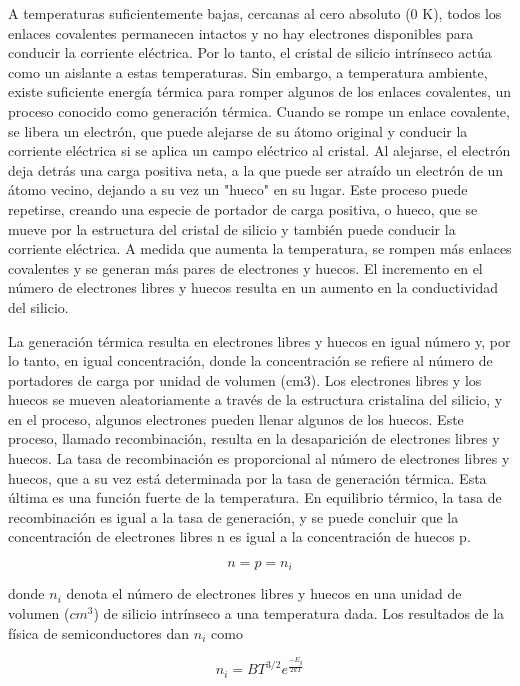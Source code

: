 A temperaturas suficientemente bajas, cercanas al cero absoluto (0 K), todos los enlaces covalentes permanecen intactos y no hay electrones disponibles para conducir la corriente eléctrica. Por lo tanto, el cristal de silicio intrínseco actúa como un aislante a estas temperaturas.
Sin embargo, a temperatura ambiente, existe suficiente energía térmica para romper algunos de los enlaces covalentes, un proceso conocido como generación térmica. Cuando se rompe un enlace covalente, se libera un electrón, que puede alejarse de su átomo original y conducir la corriente eléctrica si se aplica un campo eléctrico al cristal.
Al alejarse, el electrón deja detrás una carga positiva neta, a la que puede ser atraído un electrón de un átomo vecino, dejando a su vez un "hueco" en su lugar. Este proceso puede repetirse, creando una especie de portador de carga positiva, o hueco, que se mueve por la estructura del cristal de silicio y también puede conducir la corriente eléctrica.
A medida que aumenta la temperatura, se rompen más enlaces covalentes y se generan más pares de electrones y huecos. El incremento en el número de electrones libres y huecos resulta en un aumento en la conductividad del silicio.

La generación térmica resulta en electrones libres y huecos en igual número y, por lo tanto, en igual concentración, donde la concentración se refiere al número de portadores de carga por unidad de volumen (cm3). Los electrones libres y los huecos se mueven aleatoriamente a través de la estructura cristalina del silicio, y en el proceso, algunos electrones pueden llenar algunos de los huecos. Este proceso, llamado recombinación, resulta en la desaparición de electrones libres y huecos. La tasa de recombinación es proporcional al número de electrones libres y huecos, que a su vez está determinada por la tasa de generación térmica. Esta última es una función fuerte de la temperatura. En equilibrio térmico, la tasa de recombinación es igual a la tasa de generación, y se puede concluir que la concentración de electrones libres n es igual a la concentración de huecos p.

\begin{equation*}
n = p = n_i
\end{equation*}

donde $n_i$ denota el número de electrones libres y huecos en una unidad de volumen ($cm^3$) de silicio intrínseco a una temperatura dada. Los resultados de la física de semiconductores dan $n_i$ como

\begin{equation*}
n_i = BT^{3/2} e^{\frac{-E_g}{2kT}}
\end{equation*}

